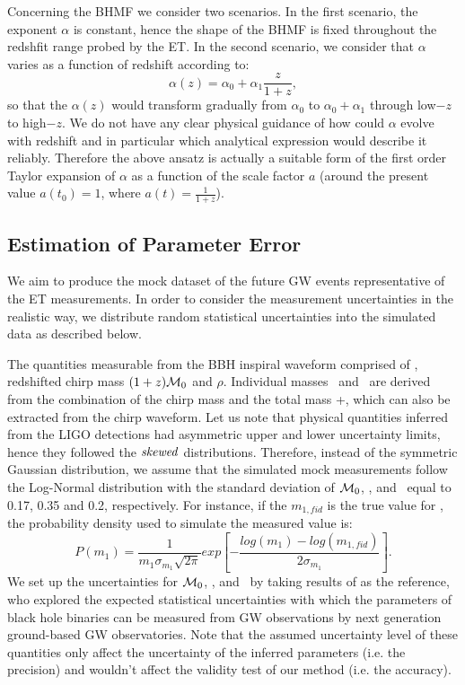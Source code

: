 \documentclass[twocolumn]{aastex62}
\newcommand{\kai}[1]{\textcolor{red}{[{\bf Kai}: #1]}}
\begin{document}
Concerning the BHMF we consider two scenarios. In the first scenario, the exponent $\alpha$ is constant, hence the shape of the BHMF is fixed throughout the redshfit range probed by the ET. In the second scenario, we consider that $\alpha$ varies as a function of redshift according to:
 \begin{equation} \label{equ_alphaz}
\alpha(z) = \alpha_0 + \alpha_1\frac{z}{1+z} , 
 \end{equation}
so that the $\alpha(z)$ would transform gradually from $\alpha_0$ to $\alpha_0+\alpha_1$ through low$-z$ to high$-z$. We do not have any clear physical guidance of how could $\alpha$ evolve  with redshift and in particular which analytical expression would describe it reliably. Therefore the above ansatz is actually a suitable form of the first order Taylor expansion of $\alpha$ as a function of the scale factor $a$ (around the present value $a(t_0)=1$, where $a(t) = \frac{1}{1+z}$).

\subsection{Estimation of Parameter Error} \label{sec_noiselevel}
We aim to produce the mock dataset of the future GW events representative of the ET  measurements. In order to consider the measurement uncertainties in the realistic way, we distribute random statistical uncertainties into the simulated data as described below.

The quantities measurable from the BBH inspiral waveform comprised of \dl, redshifted chirp mass $(1+z){\cal M}_0 $ and $\rho$. Individual masses \mone\ and \mtwo\ are derived from the combination of the chirp mass and the total mass \mone+\mtwo, which can also be extracted from the chirp waveform. 
Let us note that physical quantities inferred from the LIGO detections had asymmetric upper and lower uncertainty limits, hence they followed the  ${\it skewed}$  distributions. Therefore, instead of the symmetric Gaussian distribution, we assume that the simulated mock measurements follow the Log-Normal distribution with the standard deviation of  ${\cal M}_0$, \dl, and \mone\ equal to 0.17, 0.35 and 0.2, respectively.
For instance, if the $m_{1,fid}$ is the true value for \mone, the probability density used to simulate the measured value is:
 \begin{equation} \label{equ_lognorm}
P(m_1) = \frac{1}{m_1 \sigma_{m_1} \sqrt{2\pi}} exp \left[- \frac{log(m_1)-log(m_{1,fid})}{2\sigma_{m_1}} \right].
 \end{equation}
We set up the uncertainties for ${\cal M}_0$, \dl, and \mone\ by taking results of \citet{Ghosh2016} as the reference, who explored the expected statistical uncertainties with which the parameters of black hole binaries can be measured from GW observations by next generation ground-based GW observatories. Note that the assumed uncertainty level of these quantities only affect the uncertainty of the inferred parameters (i.e. the precision) and wouldn't affect the validity test of our method (i.e. the  accuracy).
 
\end{document}
